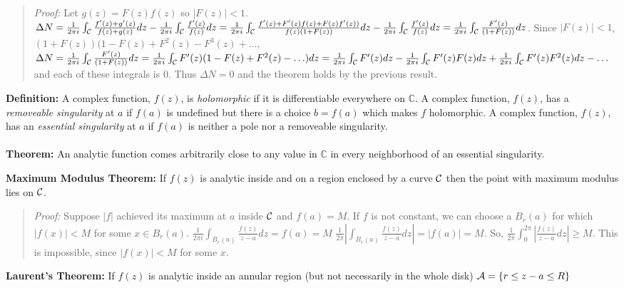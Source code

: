\begin{quote}
\emph{Proof:}
Let $g(z)= F(z)f(z)$ so $|F(z)|<1$.
$\Delta N= 
{\frac 1 {2 \pi i}} \int_{\cal C} {\frac {f'(z)+g'(z)} {f(z)+g(z)}} dz -
{\frac 1 {2 \pi i}} \int_{\cal C} {\frac {f'(z)} {f(z)}} dz=
{\frac 1 {2 \pi i}} \int_{\cal C} {\frac {f'(z)+F'(z)f(z)+F(z)f'(z))} {f(z)(1+F(z))}} dz-
{\frac 1 {2 \pi i}} \int_{\cal C} {\frac {f'(z)} {f(z)}} dz=
{\frac 1 {2 \pi i}} \int_{\cal C} {\frac {F'(z)} {(1+F(z))}} dz$.  Since
$|F(z)|<1$, $(1+F(z))(1-F(z)+F^2(z)-F^3(z)+ \ldots $,
$\Delta N= 
{\frac 1 {2 \pi i}} \int_{\cal C} {\frac {F'(z)} {(1+F(z))}} dz=
{\frac 1 {2 \pi i}} \int_{\cal C} F'(z) (1-F(z)+F^2(z)- \ldots) dz=
{\frac 1 {2 \pi i}} \int_{\cal C} F'(z)  dz-
{\frac 1 {2 \pi i}} \int_{\cal C} F'(z) F(z) dz+
{\frac 1 {2 \pi i}} \int_{\cal C} F'(z) F^2(z) dz- \ldots
$ and each of these integrals is $0$.  Thus $\Delta N= 0$ and the theorem holds by
the previous result.
\end{quote}
{\bf Definition:}  A complex function, $f(z)$, is \emph{holomorphic} if it is
differentiable everywhere on ${\mathbb C}$.
A complex function, $f(z)$, has a \emph{removeable singularity} at
$a$ if $f(a)$ is undefined but there is a choice $b=f(a)$ which makes $f$ holomorphic.
A complex function, $f(z)$, has an \emph{essential singularity} at $a$ if $f(a)$ is neither
a pole nor a removeable singularity.
\\
\\
{\bf Theorem:}  
An analytic function comes arbitrarily close to any value in ${\mathbb C}$ in every neighborhood of an
essential singularity.
\begin{quote}
\end{quote}
{\bf Maximum Modulus Theorem:} If $f(z)$ is analytic inside and on a region enclosed by a curve
${\cal C}$ then the point with maximum modulus lies on ${\cal C}$.
\begin{quote}
\emph{Proof:}
Suppose $|f|$ achieved its maximum at $a$ inside ${\cal C}$ and $f(a) = M$. If $f$ is not
constant, we can choose a $B_r(a)$ for which $|f(x)| < M$ for some $x \in B_r(a)$.
${\frac 1 {2 \pi i}} \int_{B_r(a)} {\frac {f(z)}{z-a}} dz = f(a) = M$
${\frac 1 {2 \pi}} |\int_{B_r(a)} {\frac {f(z)}{z-a}} dz| = |f(a)| = M$. So,
${\frac 1 {2 \pi}} \int_{0}^{2 \pi} |{\frac {f(z)}{z-a}} dz| \geq  M$. This is impossible,
since $|f(x)| < M$ for some $x$.
\end{quote}
{\bf Laurent's Theorem:} If $f(z)$ is analytic inside an annular region (but
not necessarily in the whole disk) ${\cal A} = \{ r \leq {z-a} \leq R \}$ 
